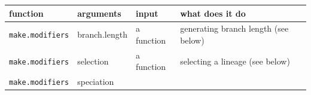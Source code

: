 \documentclass[
]{book}
\begin{document}
\begin{longtable}[]{@{}llll@{}}
\toprule
\begin{minipage}[b]{0.19\columnwidth}\raggedright
function\strut
\end{minipage} & \begin{minipage}[b]{0.23\columnwidth}\raggedright
arguments\strut
\end{minipage} & \begin{minipage}[b]{0.14\columnwidth}\raggedright
input\strut
\end{minipage} & \begin{minipage}[b]{0.33\columnwidth}\raggedright
what does it do\strut
\end{minipage}\tabularnewline
\midrule
\endhead
\begin{minipage}[t]{0.19\columnwidth}\raggedright
\texttt{make.modifiers}\strut
\end{minipage} & \begin{minipage}[t]{0.23\columnwidth}\raggedright
branch.length\strut
\end{minipage} & \begin{minipage}[t]{0.14\columnwidth}\raggedright
a function\strut
\end{minipage} & \begin{minipage}[t]{0.33\columnwidth}\raggedright
generating branch length (see below)\strut
\end{minipage}\tabularnewline
\begin{minipage}[t]{0.19\columnwidth}\raggedright
\texttt{make.modifiers}\strut
\end{minipage} & \begin{minipage}[t]{0.23\columnwidth}\raggedright
selection\strut
\end{minipage} & \begin{minipage}[t]{0.14\columnwidth}\raggedright
a function\strut
\end{minipage} & \begin{minipage}[t]{0.33\columnwidth}\raggedright
selecting a lineage (see below)\strut
\end{minipage}\tabularnewline
\begin{minipage}[t]{0.19\columnwidth}\raggedright
\texttt{make.modifiers}\strut
\end{minipage} & \begin{minipage}[t]{0.23\columnwidth}\raggedright
speciation\strut
\end{minipage} & \begin{minipage}[t]{0.14\columnwidth}\raggedright

\end{minipage}
\end{longtable}
\end{document}

